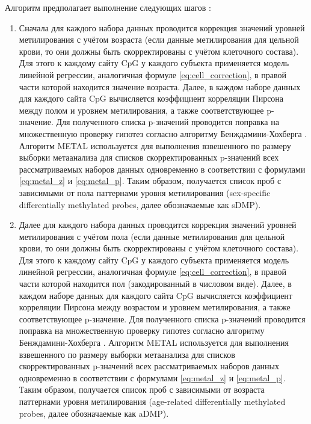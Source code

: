 Алгоритм предполагает выполнение следующих шагов \autocite{Yusipov2020}:
\begin{enumerate}
	\item Сначала для каждого набора данных проводится коррекция значений уровней метилирования с учётом возраста (если данные метилирования для цельной крови, то они должны быть скорректированы с учётом клеточного состава). Для этого к каждому сайту CpG у каждого субъекта применяется модель линейной регрессии, аналогичная формуле \ref{eq:cell_correction}, в правой части которой находится значение возраста. Далее, в каждом наборе данных для каждого сайта CpG вычисляется коэффициент корреляции Пирсона \autocite{royal1895proceedings} между полом и уровнем метилирования, а также соответствующее p-значение. Для полученного списка p-значений проводится поправка на множественную проверку гипотез согласно алгоритму Бенждамини-Хохберга \autocite{Benjamini1995}. Алгоритм METAL \autocite{Willer2010} используется для выполнения взвешенного по размеру выборки метаанализа для списков скорректированных p-значений всех рассматриваемых наборов данных одновременно в соответствии с формулами \ref{eq:metal_z} и \ref{eq:metal_p}. Таким образом, получается список проб с зависимыми от пола паттернами уровня метилирования (sex-specific differentially methylated probes, далее обозначаемые как sDMP).
	\item Далее для каждого набора данных проводится коррекция значений уровней метилирования с учётом пола (если данные метилирования для цельной крови, то они должны быть скорректированы с учётом клеточного состава). Для этого к каждому сайту CpG у каждого субъекта применяется модель линейной регрессии, аналогичная формуле \ref{eq:cell_correction}, в правой части которой находится пол (закодированный в числовом виде). Далее, в каждом наборе данных для каждого сайта CpG вычисляется коэффициент корреляции Пирсона \autocite{royal1895proceedings} между возрастом и уровнем метилирования, а также соответствующее p-значение. Для полученного списка p-значений проводится поправка на множественную проверку гипотез согласно алгоритму Бенждамини-Хохберга \autocite{Benjamini1995}. Алгоритм METAL \autocite{Willer2010} используется для выполнения взвешенного по размеру выборки метаанализа для списков скорректированных p-значений всех рассматриваемых наборов данных одновременно в соответствии с формулами \ref{eq:metal_z} и \ref{eq:metal_p}. Таким образом, получается список проб с зависимыми от возраста паттернами уровня метилирования (age-related differentially methylated probes, далее обозначаемые как aDMP).

\end{enumerate}
